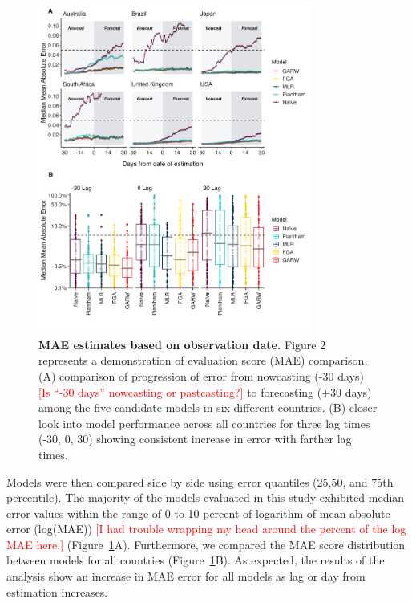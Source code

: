 \documentclass[11pt,oneside,letterpaper]{article}
\def\jhc#1{\textcolor{red}{[#1]}}
\begin{document}
\begin{figure}[H]
	\centering
	\includegraphics[width=0.8\textwidth]{figures/model_comp.png}
	\caption{\textbf{MAE estimates based on observation date.}
	Figure 2 represents a demonstration of evaluation score (MAE) comparison.
	(A) comparison of progression of error from nowcasting (-30 days) \jhc{Is ``-30 days'' nowcasting or pastcasting?} to forecasting (+30 days) among the five candidate models in six different countries.
	(B) closer look into model performance across all countries for three lag times (-30, 0, 30) showing consistent increase in error with farther lag times.
	}
	\label{fig:model_comp_fig}
\end{figure}


Models were then compared side by side using error quantiles (25,50, and 75th percentile).
The majority of the models evaluated in this study exhibited median error values within the range of 0 to 10 percent of logarithm of mean absolute error (log(MAE)) \jhc{I had trouble wrapping my head around the percent of the log MAE here.} (Figure~\ref{fig:model_comp_fig}A).
Furthermore, we compared the MAE score distribution between models for all countries (Figure~\ref{fig:model_comp_fig}B).
As expected, the results of the analysis show an increase in MAE error for all models as lag or day from estimation increases.
\end{document}
